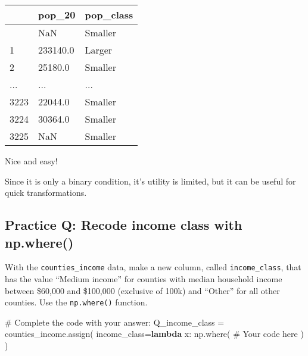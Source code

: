 \documentclass[
  letterpaper,
  DIV=11,
  numbers=noendperiod]{scrreprt}
\newenvironment{Shaded}{\begin{snugshade}}{\end{snugshade}}
\newcommand{\CommentTok}[1]{\textcolor[rgb]{0.37,0.37,0.37}{#1}}
\newcommand{\KeywordTok}[1]{\textcolor[rgb]{0.00,0.23,0.31}{\textbf{#1}}}
\newcommand{\NormalTok}[1]{\textcolor[rgb]{0.00,0.23,0.31}{#1}}
\newcommand{\OperatorTok}[1]{\textcolor[rgb]{0.37,0.37,0.37}{#1}}
\begin{document}
\begin{longtable}[]{@{}lll@{}}
\toprule\noalign{}
& pop\_20 & pop\_class \\
\midrule\noalign{}
\endhead
\bottomrule\noalign{}
\endlastfoot
0 & NaN & Smaller \\
1 & 233140.0 & Larger \\
2 & 25180.0 & Smaller \\
... & ... & ... \\
3223 & 22044.0 & Smaller \\
3224 & 30364.0 & Smaller \\
3225 & NaN & Smaller \\
\end{longtable}

Nice and easy!

Since it is only a binary condition, it's utility is limited, but it can
be useful for quick transformations.

\begin{tcolorbox}[enhanced jigsaw, colframe=quarto-callout-tip-color-frame, opacityback=0, titlerule=0mm, bottomrule=.15mm, breakable, leftrule=.75mm, colbacktitle=quarto-callout-tip-color!10!white, title=\textcolor{quarto-callout-tip-color}{\faLightbulb}\hspace{0.5em}{Practice}, rightrule=.15mm, coltitle=black, opacitybacktitle=0.6, colback=white, left=2mm, arc=.35mm, toptitle=1mm, bottomtitle=1mm, toprule=.15mm]

\subsection{Practice Q: Recode income class with
np.where()}\label{practice-q-recode-income-class-with-np.where}

With the \texttt{counties\_income} data, make a new column, called
\texttt{income\_class}, that has the value ``Medium income'' for
counties with median household income between \$60,000 and \$100,000
(exclusive of 100k) and ``Other'' for all other counties. Use the
\texttt{np.where()} function.

\begin{Shaded}
\begin{Highlighting}[]
\CommentTok{\# Complete the code with your answer:}
\NormalTok{Q\_income\_class }\OperatorTok{=}\NormalTok{ counties\_income.assign(}
\NormalTok{    income\_class}\OperatorTok{=}\KeywordTok{lambda}\NormalTok{ x: np.where(}
        \CommentTok{\# Your code here}
\NormalTok{    )}
\NormalTok{)}
\end{Highlighting}
\end{Shaded}

\end{tcolorbox}
\end{document}
